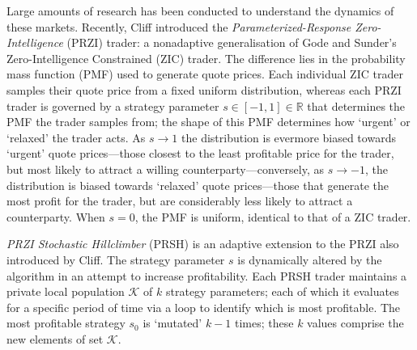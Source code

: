\documentclass[conference]{IEEEtran}
\begin{document}
Large amounts of research has been conducted to understand the dynamics of these markets.
Recently, Cliff introduced the \textit{Parameterized-Response Zero-Intelligence} (PRZI) \cite{PRZI} trader: a nonadaptive generalisation of Gode and Sunder's Zero-Intelligence Constrained (ZIC) \cite{GodeSunder} trader.
The difference lies in the probability mass function (PMF) used to generate quote prices.
Each individual ZIC trader samples their quote price from a fixed uniform distribution, whereas each PRZI trader is governed by a strategy parameter $s\in[-1, 1]\in\mathbb{R}$ that determines the PMF the trader samples from; the shape of this PMF determines how `urgent' or `relaxed' the trader acts.
As $s\to1$ the distribution is evermore biased towards `urgent' quote prices---those closest to the least profitable price for the trader, but most likely to attract a willing counterparty---conversely, as $s\to-1$, the distribution is biased towards `relaxed' quote prices---those that generate the most profit for the trader, but are considerably less likely to attract a counterparty.
When $s=0$, the PMF is uniform, identical to that of a ZIC trader.

\textit{PRZI Stochastic Hillclimber} (PRSH) \cite{PRSH} is an adaptive extension to the PRZI also introduced by Cliff.
The strategy parameter $s$ is dynamically altered by the algorithm in an attempt to increase profitability.
Each PRSH trader maintains a private local population $\mathcal{K}$ of $k$ strategy parameters; each of which it evaluates for a specific period of time via a loop to identify which is most profitable.
The most profitable strategy $s_0$ is `mutated' $k-1$ times; these $k$ values comprise the new elements of set $\mathcal{K}$.
\end{document}
